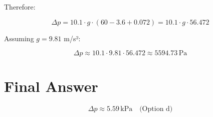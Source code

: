 \documentclass[12pt]{article}
\begin{document}
Therefore:

\[
\Delta p = 10.1 \cdot g \cdot (60 - 3.6 + 0.072) = 10.1 \cdot g \cdot 56.472
\]

Assuming $g = 9.81$ m/s²:

\[
\Delta p \approx 10.1 \cdot 9.81 \cdot 56.472 \approx 5594.73 \, \text{Pa}
\]

\section*{Final Answer}

\[
\boxed{\Delta p \approx 5.59 \, \text{kPa}} \quad \text{(Option d)}
\]
\end{document}
